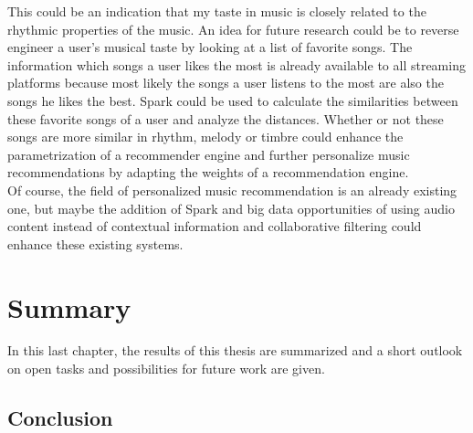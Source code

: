 \noindent This could be an indication that my taste in music is closely related to the rhythmic properties of the music. 
An idea for future research could be to reverse engineer a user's musical taste by looking at a list of favorite songs. The information which songs a user likes the most is already available to all streaming platforms because most likely the songs a user listens to the most are also the songs he likes the best. Spark could be used to calculate the similarities between these favorite songs of a user and analyze the distances. Whether or not these songs are more similar in rhythm, melody or timbre could enhance the parametrization of a recommender engine and further personalize music recommendations by adapting the weights of a recommendation engine.\\
Of course, the field of personalized music recommendation is an already existing one, but maybe the addition of Spark and big data opportunities of using audio content instead of contextual information and collaborative filtering could enhance these existing systems. 

\chapter{Summary}\label{summarych}

In this last chapter, the results of this thesis are summarized and a short outlook on open tasks and possibilities for future work are given. 

\section{Conclusion}

